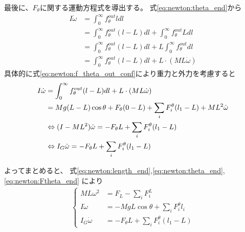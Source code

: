 \documentclass[a4paper,11pt]{jsarticle}
\begin{document}
最後に、$F_\theta$に関する運動方程式を導出する。
式\ref{eq:newton:theta_end}から
\begin{align*}
  I\dot\omega 
  &= \int_0^\infty f_\theta^{out} l dl
  \\
  &= \int_0^\infty f_\theta^{out} ( l - L ) dl
  + \int_0^\infty f_\theta^{out} L dl
  \\
  &= \int_0^\infty f_\theta^{out} ( l - L ) dl
  + L \int_0^\infty f_\theta^{out} dl
  \\
  &= \int_0^\infty f_\theta^{out} ( l - L ) dl
  + L \cdot ( ML\dot\omega) 
\end{align*}
具体的に式\ref{eq:newton:f_theta_out_conf}により重力と外力を考慮すると
\begin{align}
  I\dot\omega
  &= \int_0^\infty f_\theta^{out} ( l - L ) dl
  + L \cdot ( ML\dot\omega) 
  \notag
  \\
  &= Mg(L - L) \cos\theta + F_\theta ( 0 - L ) + \sum_i F_i^\theta ( l_1 - L ) + ML^2\dot\omega
  \notag
  \\
  & \Leftrightarrow
  ( I - ML^2 ) \dot\omega = - F_\theta L + \sum_i F_i^\theta ( l_1 - L )
  \notag
  \\
  & \Leftrightarrow
  I_G \dot\omega = - F_\theta L + \sum_i F_i^\theta ( l_1 - L )
  \label{eq:newton:Ftheta_end}
\end{align}

よってまとめると、
式\ref{eq:newton:length_end},\ref{eq:newton:theta_end},\ref{eq:newton:Ftheta_end}
により
\begin{align*}
  \begin{cases}
    ML\omega^2 &= F_L - \sum_i F_i^{L}
    \\
    I\dot\omega &= -MgL\cos\theta + \sum_i F_i^\theta l_i
    \\
    I_G \dot\omega &= - F_\theta L + \sum_i F_i^\theta ( l_1 - L )
  \end{cases}
\end{align*}
\end{document}

